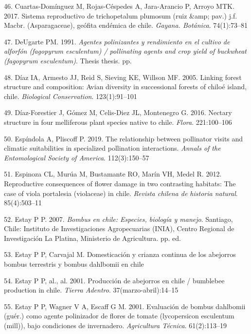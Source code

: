 \documentclass[
]{article}
\begin{document}
\leavevmode\hypertarget{ref-RN27}{}%
46. Cuartas-Domínguez M, Rojas-Céspedes A, Jara-Arancio P, Arroyo MTK.
2017. Sistema reproductivo de trichopetalum plumosum (ruiz \&amp; pav.)
j.f. Macbr. (Asparagaceae), geófita endémica de chile. \emph{Gayana.
Botánica}. 74(1):73--81

\leavevmode\hypertarget{ref-RN170}{}%
47. DeUgarte PM. 1991. \emph{Agentes polinizantes y rendimiento en el
cultivo de alforfón (fagopyrum esculentum) / pollinating agents and crop
yield of buckwheat (fagopyrum esculentum)}. Thesis thesis. pp.

\leavevmode\hypertarget{ref-RN28}{}%
48. Díaz IA, Armesto JJ, Reid S, Sieving KE, Willson MF. 2005. Linking
forest structure and composition: Avian diversity in successional
forests of chiloé island, chile. \emph{Biological Conservation}.
123(1):91--101

\leavevmode\hypertarget{ref-RN29}{}%
49. Díaz-Forestier J, Gómez M, Celis-Diez JL, Montenegro G. 2016.
Nectary structure in four melliferous plant species native to chile.
\emph{Flora}. 221:100--106

\leavevmode\hypertarget{ref-RN30}{}%
50. Espíndola A, Pliscoff P. 2019. The relationship between pollinator
visits and climatic suitabilities in specialized pollination
interactions. \emph{Annals of the Entomological Society of America}.
112(3):150--57

\leavevmode\hypertarget{ref-RN119}{}%
51. Espinoza CL, Murúa M, Bustamante RO, Marín VH, Medel R. 2012.
Reproductive consequences of flower damage in two contrasting habitats:
The case of viola portalesia (violaceae) in chile. \emph{Revista chilena
de historia natural}. 85(4):503--11

\leavevmode\hypertarget{ref-RN86}{}%
52. Estay P P. 2007. \emph{Bombus en chile: Especies, biología y
manejo}. Santiago, Chile: Instituto de Investigaciones Agropecuarias
(INIA), Centro Regional de Investigación La Platina, Ministerio de
Agricultura. pp. ed.

\leavevmode\hypertarget{ref-RN172}{}%
53. Estay P P, Carvajal M. Domesticación y crianza continua de los
abejorros bombus terrestris y bombus dahlbomii en chile

\leavevmode\hypertarget{ref-RN171}{}%
54. Estay P P, al., al. 2001. Producción de abejorros en chile /
bumblebee production in chile. \emph{Tierra Adentro}.
37(marzo-abril):14--15

\leavevmode\hypertarget{ref-RN31}{}%
55. Estay P P, Wagner V A, Escaff G M. 2001. Evaluación de bombus
dahlbomii (guér.) como agente polinizador de flores de tomate
(lycopersicon esculentum (mill)), bajo condiciones de invernadero.
\emph{Agricultura Técnica}. 61(2):113--19
\end{document}
